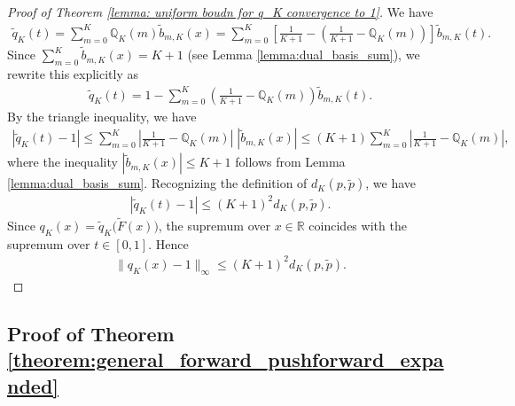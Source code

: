 \documentclass{article}
\begin{document}
\begin{proof}[Proof of Theorem \ref{lemma: uniform boudn for q_K convergence to 1}]
We have
\begin{align*}
\tilde{q}_K(t)=\sum_{m=0}^{K}\mathbb{Q}_K(m)\tilde{b}_{m,K}(x)=\sum_{m=0}^{K}\left[\frac{1}{K+1}-\left(\frac{1}{K+1}-\mathbb{Q}_K(m)\right)\right]\tilde{b}_{m,K}(t).
\end{align*}
Since \(\sum_{m=0}^{K}\tilde{b}_{m,K}(x)=K+1\) (see Lemma \ref{lemma:dual_basis_sum}), we rewrite this explicitly as
\begin{align*}
\tilde{q}_K(t)=1-\sum_{m=0}^{K}\left(\frac{1}{K+1}-\mathbb{Q}_K(m)\right)\tilde{b}_{m,K}(t).
\end{align*}
By the triangle inequality, we have
\begin{align*}
|\tilde{q}_K(t)-1|\leq \sum_{m=0}^{K}\left|\frac{1}{K+1}-\mathbb{Q}_K(m)\right|\;|\tilde{b}_{m,K}(x)| \leq (K+1)\sum_{m=0}^{K}\left|\frac{1}{K+1}-\mathbb{Q}_K(m)\right|,
\end{align*}
where the inequality \(|\tilde{b}_{m,K}(x)|\leq K+1\) follows from Lemma \ref{lemma:dual_basis_sum}. Recognizing the definition of \(d_{K}(p,\tilde{p})\), we have
\begin{align*}
|\tilde{q}_K(t)-1|\leq (K+1)^{2}d_{K}(p,\tilde{p}).
\end{align*}
Since \(q_K(x)=\tilde q_K\bigl(\tilde F(x)\bigr)\), the supremum over \(x\in\mathbb{R}\) coincides with the supremum over \(t\in[0,1]\).  Hence
\begin{align*}
    \|q_{K}(x)-1\|_{\infty} \leq (K+1)^{2}d_{K}(p,\tilde{p}).
\end{align*}
\end{proof}

\subsection{Proof of Theorem \ref{theorem:general_forward_pushforward_expanded}}
\end{document}
